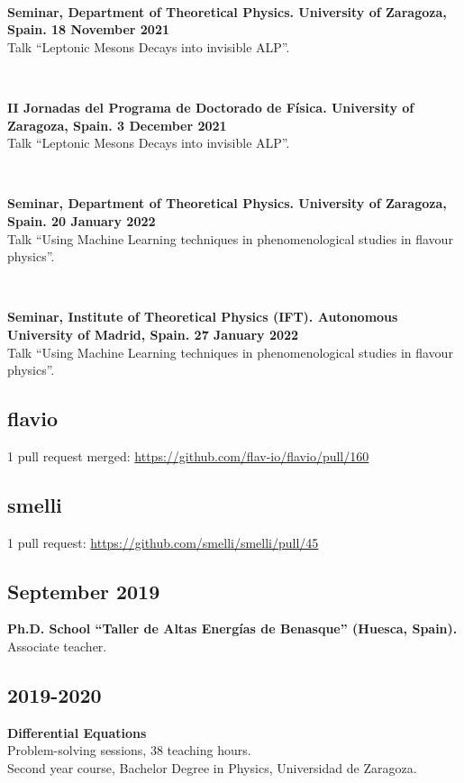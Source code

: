 \documentclass[combined.tex]{subfiles}
\begin{document}
~

\textbf{Seminar, Department of Theoretical Physics. University of Zaragoza, Spain. 18 November 2021}\\
Talk ``Leptonic Mesons Decays into invisible ALP''.

~

\textbf{II Jornadas del Programa de Doctorado de Física. University of Zaragoza, Spain. 3 December 2021}\\
Talk ``Leptonic Mesons Decays into invisible ALP''.

~

\textbf{Seminar, Department of Theoretical Physics. University of Zaragoza, Spain. 20 January 2022}\\
Talk ``Using Machine Learning techniques in phenomenological studies in flavour physics''.

~

\textbf{Seminar, Institute of Theoretical Physics (IFT). Autonomous University of Madrid, Spain. 27 January 2022}\\
Talk ``Using Machine Learning techniques in phenomenological studies in flavour physics''.


\subsection{flavio}
1 pull request merged: \url{https://github.com/flav-io/flavio/pull/160}

\subsection{smelli}
1 pull request: \url{https://github.com/smelli/smelli/pull/45}


\subsection{September 2019}
\hspace{\parindent}\textbf{Ph.D. School ``Taller de Altas Energías de Benasque'' (Huesca, Spain).}\\
Associate teacher.

\subsection{2019-2020}
\hspace{\parindent}\textbf{Differential Equations}\\
Problem-solving sessions, 38 teaching hours.\\
Second year course, Bachelor Degree in Physics, Universidad de Zaragoza.
\end{document}
